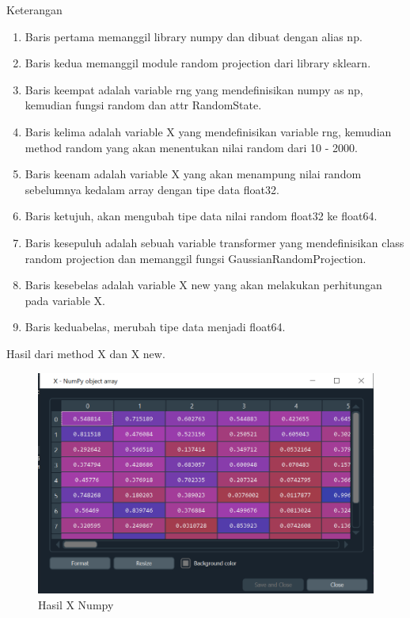 \par Keterangan
    \begin{enumerate}
        \item Baris pertama memanggil library numpy dan dibuat dengan alias np.
        \item Baris kedua memanggil module random projection dari library sklearn.
        \item Baris keempat adalah variable rng yang mendefinisikan numpy as np, kemudian fungsi random dan attr RandomState.
        \item Baris kelima adalah variable X yang mendefinisikan variable rng, kemudian method random yang akan menentukan nilai random dari 10 - 2000.
        \item Baris keenam adalah variable X yang akan menampung nilai random sebelumnya kedalam array dengan tipe data float32.
        \item Baris ketujuh, akan mengubah tipe data nilai random float32 ke float64.
        \item Baris kesepuluh adalah sebuah variable transformer yang mendefinisikan class random projection dan memanggil fungsi GaussianRandomProjection.
        \item Baris kesebelas adalah variable X new yang akan melakukan perhitungan pada variable X.
        \item Baris keduabelas, merubah tipe data menjadi float64.
    \end{enumerate}

\par Hasil dari method X dan X new.

    \begin{figure}[H]
    \centering
    \includegraphics[width=13cm]{figures/1184023/17.PNG}
    \caption{Hasil X Numpy}
    \end{figure}
    
